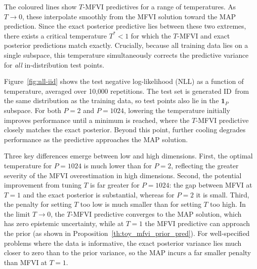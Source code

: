 \documentclass{article}
\theoremstyle{plain}
\theoremstyle{definition}
\theoremstyle{remark}
\theoremstyle{plain}
\begin{document}
The coloured lines show $T$-MFVI predictives for a range of temperatures. As $T \to 0$, these interpolate smoothly from the MFVI solution toward the MAP prediction. Since the exact posterior predictive lies between these two extremes, there exists a critical temperature $T^* < 1$ for which the $T$-MFVI and exact posterior predictions match exactly. Crucially, because all training data lies on a single subspace, this temperature simultaneously corrects the predictive variance for \emph{all} in-distribution test points.

Figure~\ref{fig:nll-iid} shows the test negative log-likelihood (NLL) as a function of temperature, averaged over 10,000 repetitions. The test set is generated ID\ from the same distribution as the training data, so test points also lie in the $\mathbf{1}_P$ subspace. For both $P = 2$ and $P = 1024$, lowering the temperature initially improves performance until a minimum is reached, where the $T$-MFVI predictive closely matches the exact posterior. Beyond this point, further cooling degrades performance as the predictive approaches the MAP solution. 

Three key differences emerge between low and high dimensions. First, the optimal temperature for $P = 1024$ is much lower than for $P = 2$, reflecting the greater severity of the MFVI overestimation in high dimensions. Second, the potential improvement from tuning $T$ is far greater for $P = 1024$: the gap between MFVI at $T=1$ and the exact posterior is substantial, whereas for $P = 2$ it is small. Third, the penalty for setting $T$ too low is much smaller than for setting $T$ too high. In the limit $T \to 0$, the $T$-MFVI predictive converges to the MAP solution, which has zero epistemic uncertainty, while at $T = 1$ the MFVI predictive can approach the prior (as shown in Proposition~\ref{th:toy_mfvi_prior_pred}). For well-specified problems where the data is informative, the exact posterior variance lies much closer to zero than to the prior variance, so the MAP incurs a far smaller penalty than MFVI at $T=1$.
\end{document}

